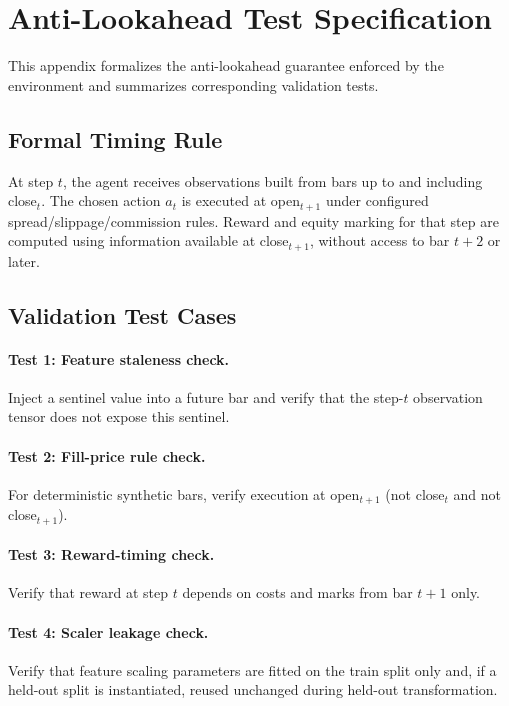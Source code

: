 \section{Anti-Lookahead Test Specification}
\label{app:antilookahead}

This appendix formalizes the anti-lookahead guarantee enforced by the environment and summarizes corresponding validation tests.

\subsection{Formal Timing Rule}
\begin{definition}
At step $t$, the agent receives observations built from bars up to and including close$_t$. The chosen action $a_t$ is executed at open$_{t+1}$ under configured spread/slippage/commission rules. Reward and equity marking for that step are computed using information available at close$_{t+1}$, without access to bar $t+2$ or later.
\end{definition}

\subsection{Validation Test Cases}
\paragraph{Test 1: Feature staleness check.}
Inject a sentinel value into a future bar and verify that the step-$t$ observation tensor does not expose this sentinel.

\paragraph{Test 2: Fill-price rule check.}
For deterministic synthetic bars, verify execution at open$_{t+1}$ (not close$_t$ and not close$_{t+1}$).

\paragraph{Test 3: Reward-timing check.}
Verify that reward at step $t$ depends on costs and marks from bar $t+1$ only.

\paragraph{Test 4: Scaler leakage check.}
Verify that feature scaling parameters are fitted on the train split only and, if a held-out split is instantiated, reused unchanged during held-out transformation.

